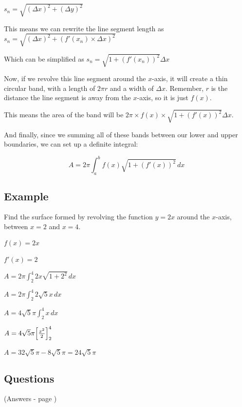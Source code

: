 \documentclass[../main.tex]{subfiles}
\begin{document}
$s_n=\sqrt{(\Delta x)^2+(\Delta y)^2}$

This means we can rewrite the line segment length as $s_n=\sqrt{(\Delta x)^2+(f'(x_n)\times \Delta x)^2}$

Which can be simplified as $s_n=\sqrt{1+(f'(x_n))^2}\Delta x$

Now, if we revolve this line segment around the $x$-axis, it will create a thin circular band, with a length of $2\pi r$ and a width of $\Delta x$. Remember, $r$ is the distance the line segment is away from the $x$-axis, so it is just $f(x)$.

This means the area of the band will be $2\pi \times f(x) \times \sqrt{1+(f'(x))^2}\Delta x$.

And finally, since we summing all of these bands between our lower and upper boundaries, we can set up a definite integral:

\[A=2\pi \int_a^b f(x)\sqrt{1+(f'(x))^2}\, dx\]
\pagebreak
\subsection*{Example}
Find the surface formed by revolving the function $y=2x$ around the $x$-axis, between $x=2$ and $x=4$.

$f(x)=2x$

$f'(x)=2$

$A=2\pi \int_2^4 2x\sqrt{1+2^2}\,dx$

$A=2\pi \int_2^4 2\sqrt{5}x\,dx$

$A=4\sqrt{5}\pi\int_2^4 x\,dx$

$A=4\sqrt{5}\pi\Bigl[\frac{x^2}{2}\Bigr]_2^4$

$A=32\sqrt{5}\pi - 8\sqrt{5}\pi=24\sqrt{5}\pi$
\pagebreak
\subsection*{Questions} 
\label{Surface of revolution}
(Answers - page {\pageref{Surface of revolution answers}})
\end{document}
